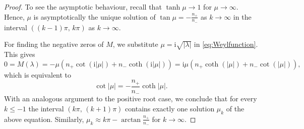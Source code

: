 \documentclass{article}
\numberwithin{equation}{section}
\theoremstyle{definition}
\newcommand{\I}{\mathrm i} %
\newcommand{\MK}{M}
\begin{document}
\begin{proof}
   To see the asymptotic behaviour, recall that 
   $\tanh \mu\to 1$ for $\mu \to \infty$. 
   Hence, $\mu$ is asymptotically the unique solution of $\tan \mu = -\frac{n_+}{n_-}$ as $k\rightarrow\infty$ in the interval $((k-1)\pi,\, k\pi)$ as $k\to\infty$.

   For finding the negative zeros of $\MK$, we substitute $\mu = \I\sqrt{|\lambda|}$ in \eqref{eq:Weylfunction}. This gives
   \begin{equation*}
   	0 = \MK(\lambda) = -\mu (n_+ \cot(\I |\mu| ) + n_- \coth (\I |\mu|)) = \I\mu (n_+ \coth(|\mu| ) + n_- \cot (|\mu|)),
   \end{equation*}
   which is equivalent to
   \begin{equation*}
   	\cot|\mu| = - \frac{n_+}{n_-} \coth |\mu|.
   \end{equation*}
   With an analogous argument to the positive root case, we conclude that for every $k\le -1$ the interval $( k\pi,\, (k+1)\pi)$ contains exactly one solution $\mu_k$ of the above equation. Similarly, $\mu_k\approx k\pi - \arctan \frac{n_+}{n_-}$ for $k\to\infty$.
   

\end{proof}
\end{document}
